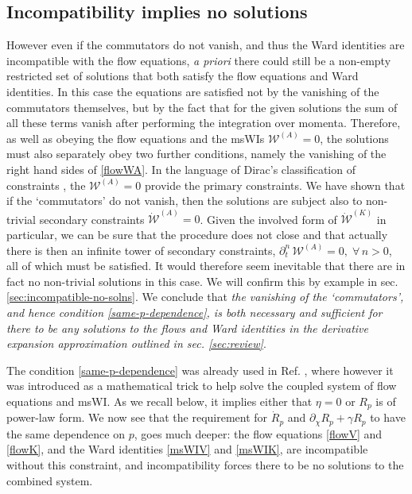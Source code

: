 \documentclass[11pt]{book} %
\numberwithin{equation}{chapter}
\begin{document}
\subsection{Incompatibility implies no solutions}
\label{sec:incompatibility}

However even if the commutators do not vanish, and thus the Ward identities are incompatible
with the flow equations, {\it a priori} there could still be a non-empty restricted set of solutions
that both satisfy the flow equations and Ward identities.
In this case the equations are satisfied not by the vanishing of the commutators themselves,
but by the fact that for the given solutions the sum of all these terms vanish after
performing the integration over momenta.
Therefore, as well as obeying the flow equations and the msWIs $\mathcal{W}^{(A)}=0$,
the solutions must also separately obey two further conditions,
namely the vanishing of the right hand sides of \eqref{flowWA}.
In the language of Dirac's classification of constraints \cite{dirac2001lectures, Dirac:1950pj},
the $\mathcal{W}^{(A)}=0$ provide the primary constraints.
We have shown that if the `commutators' do not vanish,
then the solutions are subject also to non-trivial secondary constraints $\mathcal{\dot W}^{(A)}=0$.
Given the involved form of $\mathcal{\dot W}^{(K)}$ in particular,
we can be sure that the procedure does not close and that actually there is then an infinite
tower of secondary constraints, $\partial^n_t \,\mathcal{W}^{(A)}=0,\;\forall \,n>0$,
all of which must be satisfied.
It would therefore seem inevitable that there are in fact no non-trivial solutions in this case.
We will confirm this by example in sec. \ref{sec:incompatible-no-solns}.
We conclude that \emph{the vanishing of the `commutators',
and hence condition \eqref{same-p-dependence},
is both necessary and sufficient for there to be any solutions to the flows and Ward identities
in the derivative expansion approximation outlined in sec. \ref{sec:review}}.

The condition \eqref{same-p-dependence} was already used in Ref. \cite{Dietz:2015owa},
where however it was introduced as a mathematical trick to help solve the coupled system of
flow equations and msWI. As we recall below, it implies either that $\eta=0$ or $R_p$ is of power-law form.
We now see that the requirement for $\dot R_p$ and $\partial_{\chi} R_p + \gamma R_p$ to have the
same dependence on $p$, goes much deeper: the flow equations \eqref{flowV} and \eqref{flowK},
and the Ward identities \eqref{msWIV} and \eqref{msWIK}, are incompatible without this constraint,
and incompatibility forces there to be no solutions to the combined system.
\end{document}

